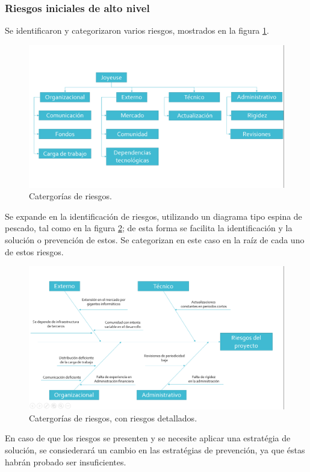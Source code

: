 \documentclass[]{article}
\begin{document}
\subsubsection{Riesgos iniciales de alto nivel}
Se identificaron y categorizaron varios riesgos, mostrados en la figura \ref{ries2}.
\begin{figure} [H]
	\centering
	\includegraphics[width=1\textwidth]{RBS}
	\caption{Catergor\'ias de riesgos.} 
	\label{ries2}
\end{figure}
Se expande en la identificaci\'on de riesgos, utilizando un diagrama tipo espina de pescado, tal como en la figura \ref{pescado2}; de esta forma se facilita la identificaci\'on y la soluci\'on o prevenci\'on de estos. Se categorizan en este caso en la ra\'iz de cada uno de estos riesgos. 
\begin{figure} [H]
	\centering
	\includegraphics[width=1\textwidth]{Espina}
	\caption{Catergor\'ias de riesgos, con riesgos detallados.} 
	\label{pescado2}
\end{figure}

En caso de que los riesgos se presenten y se necesite aplicar una estrat\'egia de soluci\'on, se consiederar\'a un cambio en las estrat\'egias de prevenci\'on, ya que \'estas habr\'an probado ser insuficientes. 
\end{document}
